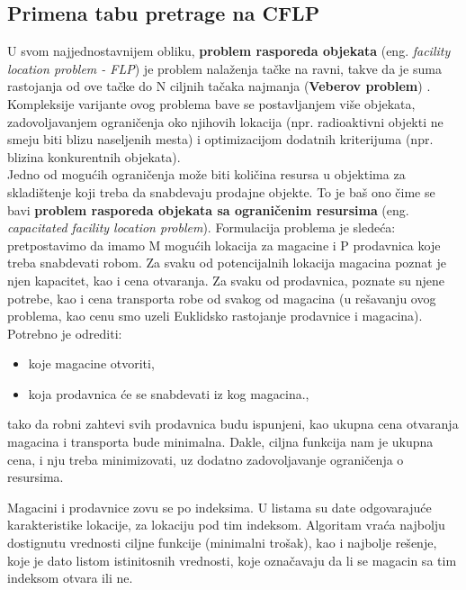 \documentclass[a4paper]{article}
\begin{document}
\subsection{Primena tabu pretrage na CFLP}
U svom najjednostavnijem obliku, \textbf{problem rasporeda objekata} (eng. \textit{facility location problem - FLP}) je problem nalaženja tačke na ravni, takve da je suma rastojanja od ove tačke do N ciljnih tačaka najmanja (\textbf{Veberov problem}) \cite{weber}. Kompleksije varijante ovog problema bave se postavljanjem više objekata, zadovoljavanjem ograničenja oko njihovih lokacija (npr. radioaktivni objekti ne smeju biti blizu naseljenih mesta) i optimizacijom dodatnih kriterijuma (npr. blizina konkurentnih objekata).\\

Jedno od mogućih ograničenja može biti količina resursa u objektima za skladištenje koji treba da snabdevaju prodajne objekte. To je baš ono čime se bavi \textbf{problem rasporeda objekata sa ograničenim resursima} (eng. \textit{capacitated facility location problem}). Formulacija problema je sledeća: pretpostavimo da imamo M mogućih lokacija za magacine i P prodavnica koje treba snabdevati robom. Za svaku od potencijalnih lokacija magacina poznat je njen kapacitet, kao i cena otvaranja. Za svaku od prodavnica, poznate su njene potrebe, kao i cena transporta robe od svakog od magacina (u rešavanju ovog problema, kao cenu smo uzeli Euklidsko rastojanje prodavnice i magacina). Potrebno je odrediti:
\begin{itemize}
    \item koje magacine otvoriti,
    \item koja prodavnica će se snabdevati iz kog magacina.,
\end{itemize}
tako da robni zahtevi svih prodavnica budu ispunjeni, kao ukupna cena otvaranja magacina i transporta bude minimalna. Dakle, ciljna funkcija nam je ukupna cena, i nju treba minimizovati, uz dodatno zadovoljavanje ograničenja o resursima.

Magacini i prodavnice zovu se po indeksima. U listama su date odgovarajuće karakteristike lokacije, za lokaciju pod tim indeksom. Algoritam vraća najbolju dostignutu vrednosti ciljne funkcije (minimalni trošak), kao i najbolje rešenje, koje je dato listom istinitosnih vrednosti, koje označavaju da li se magacin sa tim indeksom otvara ili ne.
\end{document}
